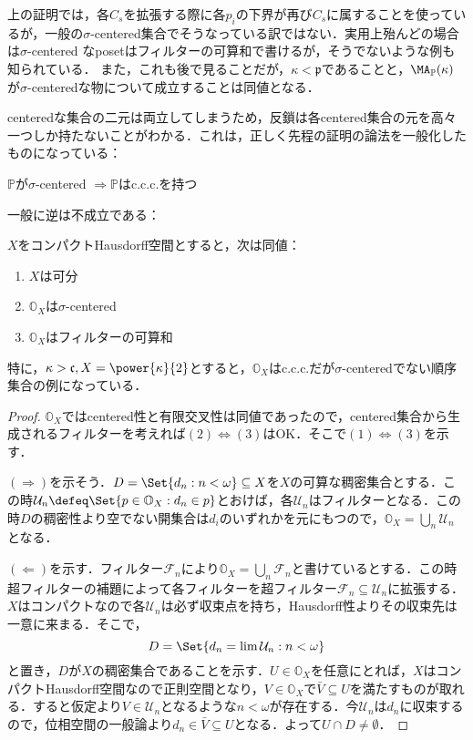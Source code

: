 \documentclass[a4j]{bxjsarticle}
\theoremstyle{definition}
\begin{document}
上の証明では，各$C_s$を拡張する際に各$p_i$の下界が再び$C_s$に属することを使っているが，一般の$\sigma$-centered集合でそうなっている訳ではない．実用上殆んどの場合は$\sigma$-centered なposetはフィルターの可算和で書けるが，そうでないような例も知られている．
また，これも後で見ることだが，$\kappa < \mathfrak{p}$であることと，$\MA_\mathbb{P}(\kappa)$が$\sigma$-centeredな物について成立することは同値となる．

centeredな集合の二元は両立してしまうため，反鎖は各centered集合の元を高々一つしか持たないことがわかる．これは，正しく先程の証明の論法を一般化したものになっている：
\begin{lemma}
 $\mathbb{P}$が$\sigma$-centered $\Rightarrow \mathbb{P}$はc.c.c.を持つ
\end{lemma}

一般に逆は不成立である：

\begin{exercise}
 $X$をコンパクトHausdorff空間とすると，次は同値：
 \begin{enumerate}[label=(\arabic*)]
  \item $X$は可分\label{cond:X-separable}
  \item $\mathbb{O}_X$は$\sigma$-centered\label{OX:sigma-centered}
  \item $\mathbb{O}_X$はフィルターの可算和\label{OX:countable-union-of-filters}
 \end{enumerate}

 特に，$\kappa > \mathfrak{c}, X = \power{\kappa}{2}$とすると，$\mathbb{O}_X$はc.c.c.だが$\sigma$-centeredでない順序集合の例になっている．
\end{exercise}
\begin{proof}
 $\mathbb{O}_X$ではcentered性と有限交叉性は同値であったので，centered集合から生成されるフィルターを考えれば$(2) \Leftrightarrow (3)$はOK．そこで$(1) \Leftrightarrow (3)$を示す．

 $(\Rightarrow)$を示そう．$D = \Set{d_n : n < \omega} \subseteq X$を$X$の可算な稠密集合とする．この時$\mathcal{U}_n \defeq \Set{ p \in \mathbb{O}_X : d_n \in p }$とおけば，各$\mathcal{U}_n$はフィルターとなる．この時$D$の稠密性より空でない開集合は$d_i$のいずれかを元にもつので，$\mathbb{O}_X = \bigcup_n \mathcal{U}_n$となる．

 $(\Leftarrow)$を示す．フィルター$\mathcal{F}_n$により$\mathbb{O}_X = \bigcup_n \mathcal{F}_n$と書けているとする．この時超フィルターの補題によって各フィルターを超フィルター$\mathcal{F}_n \subseteq \mathcal{U}_n$に拡張する．$X$はコンパクトなので各$\mathcal{U}_n$は必ず収束点を持ち，Hausdorff性よりその収束先は一意に来まる．そこで，
 \[
  D = \Set{ d_n = \lim \mathcal{U}_n : n < \omega}
 \]
 と置き，$D$が$X$の稠密集合であることを示す．$U \in \mathbb{O}_X$を任意にとれば，$X$はコンパクトHausdorff空間なので正則空間となり，$V \in \mathbb{O}_X$で$\bar{V} \subseteq U$を満たすものが取れる．すると仮定より$V \in \mathcal{U}_n$となるような$n < \omega$が存在する．今$\mathcal{U}_n$は$d_n$に収束するので，位相空間の一般論より$d_n \in \bar{V} \subseteq U$となる．よって$U \cap D \neq \emptyset$．\mbox{}
\end{proof}
\end{document}
